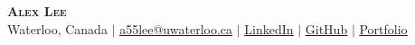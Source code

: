 \begin{center}
    \textbf{\Huge \scshape Alex Lee} \\ \vspace{1pt}
    {Waterloo, Canada} $|$ 
    \href{mailto:a55lee@uwaterloo.ca}{\underline{a55lee@uwaterloo.ca}} $|$ 
    \href{https://www.linkedin.com/in/alex-jiwon-lee/}{\underline{LinkedIn}} $|$
    \href{https://github.com/1128alex}{\underline{GitHub}} $|$ 
    \href{https://1128alex.github.io/alex-lee/}{\underline{Portfolio}}
\end{center}
